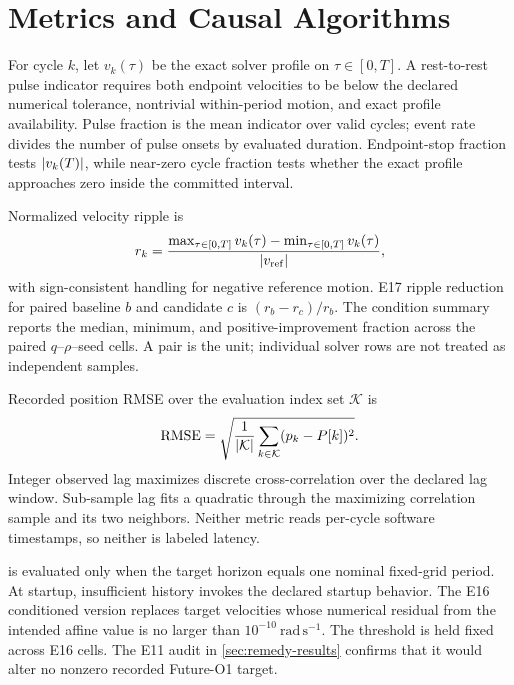 \section{Metrics and Causal Algorithms}
\label{app:metrics}

For cycle $k$, let $v_k(\tau)$ be the exact solver profile on $\tau\in[0,T]$. A rest-to-rest pulse indicator requires both endpoint velocities to be below the declared numerical tolerance, nontrivial within-period motion, and exact profile availability. Pulse fraction is the mean indicator over valid cycles; event rate divides the number of pulse onsets by evaluated duration. Endpoint-stop fraction tests $\lvert v_k(T)\rvert$, while near-zero cycle fraction tests whether the exact profile approaches zero inside the committed interval.

Normalized velocity ripple is
\begin{equation}
 r_k=\frac{\max_{\tau\in[0,T]}v_k(\tau)-\min_{\tau\in[0,T]}v_k(\tau)}{\lvert v_{\mathrm{ref}}\rvert},
\end{equation}
with sign-consistent handling for negative reference motion. E17 ripple reduction for paired baseline $b$ and candidate $c$ is $(r_b-r_c)/r_b$. The condition summary reports the median, minimum, and positive-improvement fraction across the \ESeventeenPairPerCondition{} paired $q$--$\rho$--seed cells. A pair is the unit; individual solver rows are not treated as independent samples.

Recorded position RMSE over the evaluation index set $\mathcal K$ is
\begin{equation}
 \operatorname{RMSE}=\sqrt{\frac{1}{\lvert \mathcal K\rvert}\sum_{k\in\mathcal K}(p_k-P[k])^2}.
\end{equation}
Integer observed lag maximizes discrete cross-correlation over the declared lag window. Sub-sample lag fits a quadratic through the maximizing correlation sample and its two neighbors. Neither metric reads per-cycle software timestamps, so neither is labeled latency.

\FutureOOne{} is evaluated only when the target horizon equals one nominal fixed-grid period. At startup, insufficient history invokes the declared startup behavior. The E16 conditioned version replaces target velocities whose numerical residual from the intended affine value is no larger than $10^{-10}\ \mathrm{rad\,s^{-1}}$. The threshold is held fixed across E16 cells. The E11 audit in \cref{sec:remedy-results} confirms that it would alter no nonzero recorded Future-O1 target.
